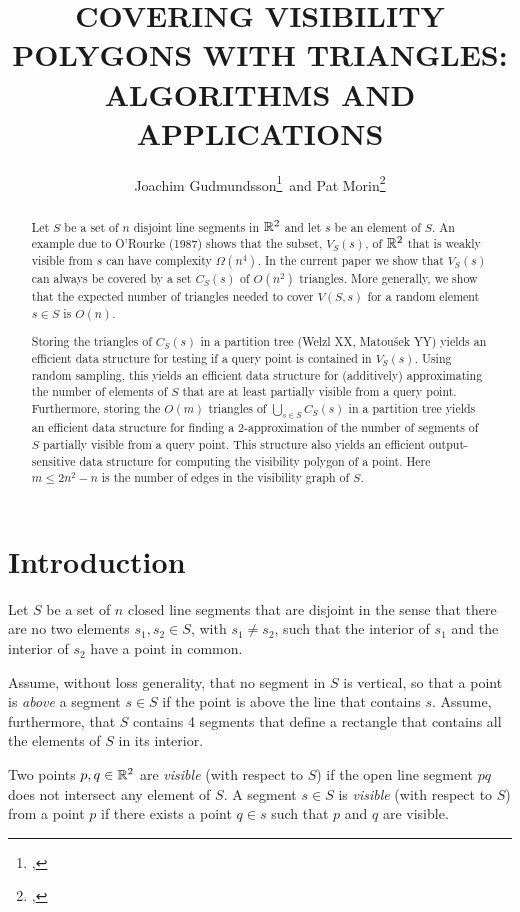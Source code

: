 \documentclass{patmorin}
\title{\MakeUppercase{Covering Visibility Polygons with Triangles:\newline
       Algorithms and Applications}}
\author{Joachim Gudmundsson\thanks{\affil{NICTA},
\email{joachim.gudmundsson@nicta.com.au}}\, 
       and Pat Morin\thanks{\affil{Carleton University},
\email{morin@scs.carleton.ca}}}
\begin{document}
\maketitle
\begin{abstract}
Let $S$ be a set of $n$ disjoint line segments in $\mathbb{R}^2$ and let $s$ be an
element of $S$.  An example due to O'Rourke (1987) shows that the subset,
$V_S(s)$, of $\mathbb{R}^2$ that is weakly visible from $s$ can have complexity
$\Omega(n^4)$.  In the current paper we show that $V_S(s)$ can always be
covered by a set $C_S(s)$ of $O(n^2)$ triangles.  More generally, we show
that the expected number of triangles needed to cover $V(S,s)$ for a random
element $s\in S$ is $O(n)$.

Storing the triangles of $C_S(s)$ in a partition tree (Welzl XX, Matou\v{s}ek
YY) yields an efficient data structure for testing if a query point is
contained in $V_S(s)$. Using random sampling, this yields an efficient
data structure for (additively) approximating the number of elements of
$S$ that are at least partially visible from a query point.  Furthermore,
storing the $O(m)$ triangles of $\bigcup_{s\in S} C_S(s)$ in a partition
tree yields an efficient data structure for finding a 2-approximation
of the number of segments of $S$ partially visible from a query point.
This structure also yields an efficient output-sensitive data structure
for computing the visibility polygon of a point.  Here $m\le 2n^2-n$
is the number of edges in the visibility graph of $S$.
\end{abstract}

\section{Introduction}

Let $S$ be a set of $n$ closed line segments that are disjoint in the sense
that there are no two elements $s_1,s_2\in S$, with $s_1\neq s_2$, such
that the interior of $s_1$ and the interior of $s_2$ have a point in
common. 

Assume, without loss generality, that no segment in $S$ is vertical, so
that a point is \emph{above} a segment $s\in S$ if the point is above the
line that contains $s$.  Assume, furthermore, that $S$ contains 4 segments
that define a rectangle that contains all the elements of $S$ in its
interior.  

Two points $p,q\in\mathbb{R}^2$ are \emph{visible} (with respect to $S$) if the
open line segment $pq$ does not intersect any element of $S$.  A segment
$s\in S$ is \emph{visible} (with respect to $S$) from a point $p$ if there
exists a point $q\in s$ such that $p$ and $q$ are visible.
\end{document}
